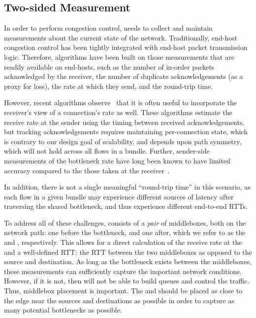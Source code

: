 \subsection{Two-sided Measurement}\label{s:design:twosided}
In order to perform congestion control, \name needs to collect and maintain measurements about the current state of the network.
Traditionally, end-host congestion control has been tightly integrated with end-host packet transmission logic. Therefore, algorithms have been built on those measurements that are readily available on end-hosts, such as the number of in-order packets acknowledged by the receiver, the number of duplicate acknowledgements (as a proxy for loss), the rate at which they send, and the round-trip time.

However, recent algorithms observe~\cite{bbr, sprout, remy, nimbus} that it is often useful to incorporate the receiver's view of a connection's rate as well. These algorithms estimate the receive rate at the sender using the timing between received acknowledgements, but tracking acknowledgements requires maintaining per-connection state, which is contrary to our design goal of scalability, and depends upon path symmetry, which will not hold across all flows in a bundle. Further, sender-side measurements of the bottleneck rate have long been known to have limited accuracy compared to the those taken at the receiver~\cite{packet-dynamics, path-properties}.

In addition, there is not a single meaningful ``round-trip time'' in this scenario, as each flow in a given bundle may experience different sources of latency after traversing the shared bottleneck, and thus experience different end-to-end RTTs. 

To address all of these challenges, \name consists of a \emph{pair} of middleboxes, both on the network path: one before the bottleneck, and one after, which we refer to as the \textit{\inbox} and \textit{\outbox}, respectively. 
This allows for a direct calculation of the receive rate at the \outbox and a well-defined RTT: the RTT between the two middleboxes as opposed to the source and destination. As long as the bottleneck exists between the middleboxes, these measurements can sufficiently capture the important network conditions. 
However, if it is not, then \name will not be able to build queues and control the traffic. Thus, middlebox placement is important. The \inbox and \outbox should be placed as close to the edge near the sources and destinations as possible in order to capture as many potential bottlenecks as possible.

